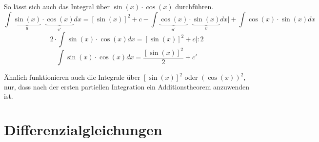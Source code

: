 \documentclass[
	11pt, %
]{beamer}
\begin{document}
\begin{frame}
	
	
	\begin{exampleblock}{So l\"asst sich auch das Integral \"uber $\sin(x)\cdot \cos(x)$ durchf\"uhren.}
		\begin{equation}
			\int \underbrace{\sin(x)}_{u}\cdot \underbrace{\cos(x)}_{v'}dx = [\sin(x)]^2+c-\int \underbrace{\cos(x)}_{u'}\cdot \underbrace{\sin(x)}_{v}dx\bigg| +\int \cos(x)\cdot \sin(x)dx
		\end{equation}
		\begin{equation}
			2\cdot \int \sin(x)\cdot \cos(x)dx = [\sin(x)]^2+c\bigg| :2
		\end{equation}
		\begin{equation}
			\int \sin(x)\cdot \cos(x)dx = \frac{[\sin(x)]^2}{2}+c'
		\end{equation}
	\end{exampleblock}
	\"Ahnlich funktionieren auch die Integrale \"uber $[\sin(x)]^2$ oder $(\cos(x))^2$, nur, dass nach der ersten partiellen Integration ein Additionstheorem anzuwenden ist.
	
	
\end{frame}
\section{Differenzialgleichungen}
\end{document}
